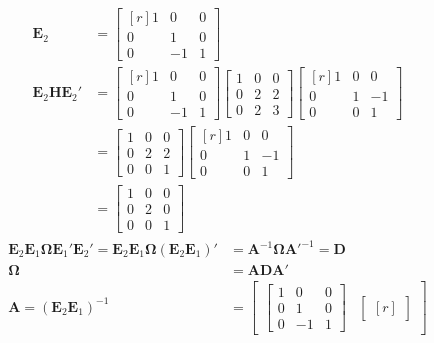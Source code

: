 \begin{enumerate}
\begin{align*}
	\mathbf{E}_2&=\begin{bmatrix*}[r]
	1&0&0\\
	0&1&0\\
	0&-1&1
	\end{bmatrix*}\\
	\mathbf{E}_2\mathbf{H}\mathbf{E}_2{'}&=\begin{bmatrix*}[r]
	1&0&0\\
	0&1&0\\
	0&-1&1
	\end{bmatrix*}
	\begin{bmatrix}
	1&0&0\\
	0&2&2\\
	0&2&3
	\end{bmatrix}
	\begin{bmatrix*}[r]
	1&0&0\\
	0&1&-1\\
	0&0&1
	\end{bmatrix*}\\
	&=\begin{bmatrix}
	1&0&0\\
	0&2&2\\
	0&0&1
	\end{bmatrix}
		\begin{bmatrix*}[r]
	1&0&0\\
	0&1&-1\\
	0&0&1
	\end{bmatrix*}\\
	&=\begin{bmatrix}
	1&0&0\\
	0&2&0\\
	0&0&1
	\end{bmatrix}
\end{align*}
\begin{align*}
\mathbf{E}_2\mathbf{E}_1\boldsymbol{\Omega}\mathbf{E}_1{'}\mathbf{E}_2{'}=\mathbf{E}_2\mathbf{E}_1\boldsymbol{\Omega}(\mathbf{E}_2\mathbf{E}_1)'&=\mathbf{A}^{-1}\boldsymbol{\Omega}\mathbf{A}{'}^{-1}=\mathbf{D}\\
\boldsymbol{\Omega}&=\mathbf{A}\mathbf{D}\mathbf{A}'\\
\mathbf{A}=(\mathbf{E}_2\mathbf{E}_1)^{-1}&=
\begin{bmatrix}\begin{bmatrix}
1&0&0\\
0&1&0\\
0&-1&1
\end{bmatrix}&
\begin{bmatrix*}[r]

\end{bmatrix*}
\end{bmatrix}
\end{align*}
\end{enumerate}
